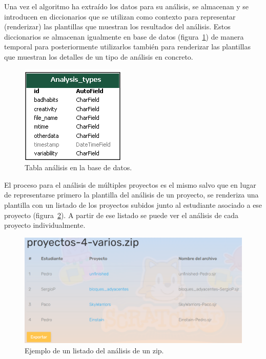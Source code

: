 \documentclass[a4paper, 12pt]{book}
\begin{document}

Una vez el algoritmo ha extraído los datos para su análisis, se almacenan y se introducen en diccionarios que se utilizan como contexto para representar (renderizar) las plantillas que muestran los resultados del análisis.
Estos diccionarios se almacenan igualmente en base de datos (figura~\ref{fig:bd_analisis}) de manera temporal para posteriormente utilizarlos también para renderizar las plantillas que muestran los detalles de un tipo de análisis en concreto.

\newpage
\begin{figure}[H]
  \centering
  \includegraphics[keepaspectratio]{img/bd_analisis.png}
  \caption{Tabla análisis en la base de datos.}\label{fig:bd_analisis}
\end{figure}

El proceso para el análisis de múltiples proyectos es el mismo salvo que en lugar de representarse primero la plantilla del análisis de un proyecto, se renderiza una plantilla con un listado de los proyectos subidos junto al estudiante asociado a ese proyecto (figura~\ref{fig:listado_zip}).
A partir de ese listado se puede ver el análisis de cada proyecto individualmente.

\vspace{3mm}
\begin{figure}[H]
  \centering
  \includegraphics[width=13cm, keepaspectratio]{img/listado_zip.png}
  \caption{Ejemplo de un listado del análisis de un zip.}\label{fig:listado_zip}
\end{figure}
\end{document}
